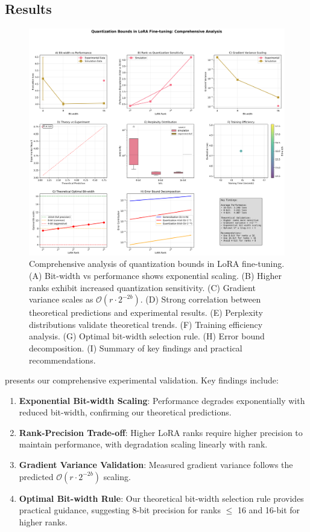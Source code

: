 \documentclass[10pt,twocolumn]{article}
\begin{document}
\subsection{Results}

\begin{figure}[t]
\centering
\includegraphics[width=\columnwidth]{figures/comprehensive_analysis.png}
\caption{Comprehensive analysis of quantization bounds in LoRA fine-tuning. (A) Bit-width vs performance shows exponential scaling. (B) Higher ranks exhibit increased quantization sensitivity. (C) Gradient variance scales as $\mathcal{O}(r \cdot 2^{-2b})$. (D) Strong correlation between theoretical predictions and experimental results. (E) Perplexity distributions validate theoretical trends. (F) Training efficiency analysis. (G) Optimal bit-width selection rule. (H) Error bound decomposition. (I) Summary of key findings and practical recommendations.}
\label{fig:comprehensive}
\end{figure}

 presents our comprehensive experimental validation. Key findings include:

\begin{enumerate}
\item \textbf{Exponential Bit-width Scaling}: Performance degrades exponentially with reduced bit-width, confirming our theoretical predictions.

\item \textbf{Rank-Precision Trade-off}: Higher LoRA ranks require higher precision to maintain performance, with degradation scaling linearly with rank.

\item \textbf{Gradient Variance Validation}: Measured gradient variance follows the predicted $\mathcal{O}(r \cdot 2^{-2b})$ scaling.

\item \textbf{Optimal Bit-width Rule}: Our theoretical bit-width selection rule provides practical guidance, suggesting 8-bit precision for ranks $\leq$ 16 and 16-bit for higher ranks.
\end{enumerate}
\end{document}
